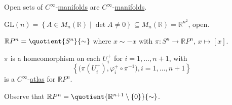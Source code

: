 \begin{eg}
	Open sets of \(C^{\infty} \)-\hyperref[def:smooth-manifold]{manifolds} are \(C^{\infty}\)-\hyperref[def:smooth-manifold]{manifolds}.
\end{eg}

\begin{eg}
	\(\mathrm{GL} (n) = \left\{ A\in M_n(\mathbb{R} ) \mid \det A \neq 0 \right\} \subseteq M_n(\mathbb{R} ) = \mathbb{R} ^{n^2}\), open.
\end{eg}

\begin{eg}
	\(\mathbb{R} P^n = \quotient{S^n}{\sim } \) where \(x \sim -x\) with \(\pi \colon S^n \to \mathbb{R} P^n\), \(x \mapsto [x]\).
\end{eg}
\begin{explanation}
	\(\pi \) is a homeomorphism on each \(U_i^+\) for \(i=1, \ldots , n+1\), with
	\[
		\left\{ \big( \pi (U_i^+), \varphi _i^+ \circ \pi ^{-1}  \big), i=1, \ldots , n+1 \right\}
	\]
	is a \(C^{\infty} \)-\hyperref[def:differentiable-atlas]{atlas} for \(\mathbb{R} P^n\).
\end{explanation}

\begin{note}
	Observe that \(\mathbb{R} P^n = \quotient{\mathbb{R} ^{n+1} \setminus \left\{ 0 \right\} }{\sim } \).
\end{note}